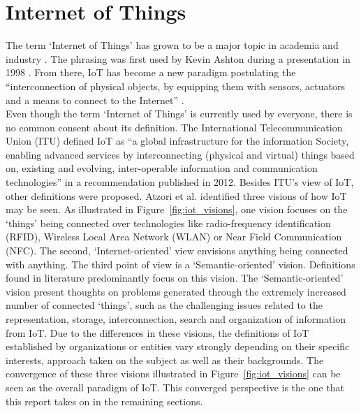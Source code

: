 \section{Internet of Things}
\label{sec:iot}
\vspace{-1em}
	The term `Internet of Things' has grown to be a major topic in academia and industry \cite{ju}. The phrasing was first used by Kevin Ashton during a presentation in 1998 \cite{westerlund}. From there, IoT has become a new paradigm postulating the ``interconnection of physical objects, by equipping them with sensors, actuators and a means to connect to the Internet'' \cite{dijkman}.\\
	Even though the term `Internet of Things' is currently used by everyone, there is no common consent about its definition. The International Telecommunication Union (ITU) defined IoT as ``a global infrastructure for the information Society, enabling advanced services by interconnecting (physical and virtual) things based on, existing and evolving, inter-operable information and communication technologies'' \cite{itu} in a recommendation published in 2012. Besides ITU's view of IoT, other definitions were proposed. Atzori et al. \cite{atzori} identified three visions of how IoT may be seen. As illustrated in Figure~\ref{fig:iot_visions}, one vision focuses on the `things' being connected over technologies like radio-frequency identification (RFID), Wireless Local Area Network (WLAN) or Near Field Communication (NFC). The second, `Internet-oriented' view envisions anything being connected with anything. The third point of view is a `Semantic-oriented' vision. Definitions found in literature predominantly focus on this vision. The `Semantic-oriented' vision present thoughts on problems generated through the extremely increased number of connected `things', such as the challenging issues related to the representation, storage, interconnection, search and organization of information from IoT. Due to the differences in these visions, the definitions of IoT established by organizations or entities vary strongly depending on their specific interests, approach taken on the subject as well as their backgrounds. The convergence of these three visions illustrated in Figure~\ref{fig:iot_visions} can be seen as the overall paradigm of IoT. This converged perspective is the one that this report takes on in the remaining sections.

